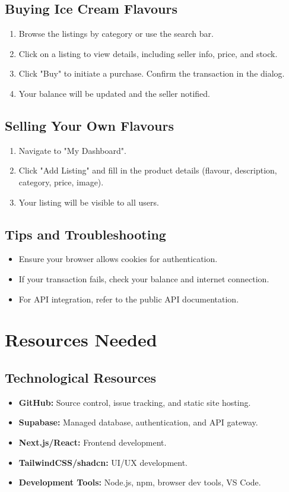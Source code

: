 \documentclass[12pt,a4paper]{report}
\begin{document}
\section{Buying Ice Cream Flavours}
\begin{enumerate}
    \item Browse the listings by category or use the search bar.
    \item Click on a listing to view details, including seller info, price, and stock.
    \item Click "Buy" to initiate a purchase. Confirm the transaction in the dialog.
    \item Your balance will be updated and the seller notified.
\end{enumerate}

\section{Selling Your Own Flavours}
\begin{enumerate}
    \item Navigate to "My Dashboard".
    \item Click "Add Listing" and fill in the product details (flavour, description, category, price, image).
    \item Your listing will be visible to all users.
\end{enumerate}

\section{Tips and Troubleshooting}
\begin{itemize}
    \item Ensure your browser allows cookies for authentication.
    \item If your transaction fails, check your balance and internet connection.
    \item For API integration, refer to the public API documentation.
\end{itemize}

\chapter{Resources Needed}
\section{Technological Resources}
\begin{itemize}
    \item \textbf{GitHub:} Source control, issue tracking, and static site hosting.
    \item \textbf{Supabase:} Managed database, authentication, and API gateway.
    \item \textbf{Next.js/React:} Frontend development.
    \item \textbf{TailwindCSS/shadcn:} UI/UX development.
    \item \textbf{Development Tools:} Node.js, npm, browser dev tools, VS Code.
\end{itemize}
\end{document}
